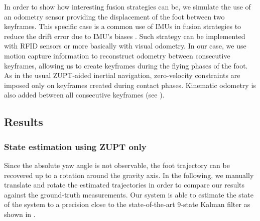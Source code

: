 In order to show how interesting fusion strategies can be, we simulate the use of an odometry sensor providing the displacement of the foot between two keyframes.
This specific case is a common use of IMUs in fusion strategies to reduce the drift error due to IMU's biases \cite{santamaria2015high}. %
Such strategy can be implemented with RFID sensors or more basically with visual odometry. 
In our case, we use motion capture information to reconstruct odometry between consecutive keyframes, allowing us to create keyframes during the flying phases of the foot. As in the usual ZUPT-aided inertial
navigation, zero-velocity constraints are imposed only on keyframes created during contact phases. Kinematic odometry is also added between all consecutive keyframes (see ).

%

\subsection{Results}
\subsubsection{State estimation using ZUPT only}

Since the absolute yaw angle is not observable,
the foot trajectory can be recovered up to a rotation around the gravity axis. 
In the following, we manually translate and rotate the estimated trajectories in order to compare our results against the ground-truth measurements.
Our system is able to estimate the state of the system to a precision close to the state-of-the-art 9-state Kalman filter \cite{foxlin2005pedestrian} as shown in .

